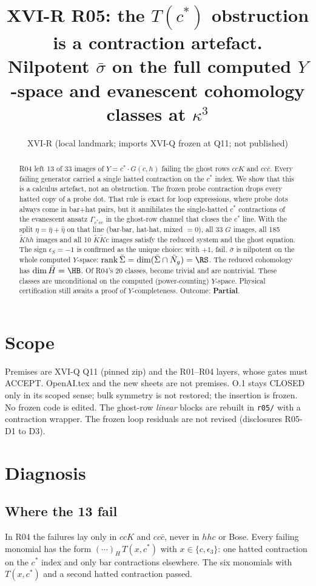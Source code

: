\documentclass[11pt]{article}
\title{XVI-R R05: the $T(c^*)$ obstruction is a contraction artefact.\\
Nilpotent $\bar\sigma$ on the full computed $Y$-space and \HB{} evanescent cohomology classes at $\kappa^3$}
\author{XVI-R (local landmark; imports XVI-Q frozen at Q11; not published)}
\date{}
\begin{document}
\maketitle
\begin{abstract}
R04 left 13 of 33 images of $Y=c^*\cdot G(c,h)$ failing the ghost rows $ccK$ and $cc\bar c$. Every failing generator
carried a single hatted contraction on the $c^*$ index. We show that this is a calculus artefact, not an obstruction.
The frozen probe contraction drops every hatted copy of a probe dot. That rule is exact for loop expressions, where
probe dots always come in bar$+$hat pairs, but it annihilates the single-hatted $c^*$ contractions of the evanescent
ansatz $\Gamma_{c^*cc}$ in the ghost-row channel that closes the $c^*$ line. With the split
$\eta=\bar\eta+\hat\eta$ on that line (bar$\cdot$bar, hat$\cdot$hat, mixed $=0$), all 33 $G$ images, all 185
$\tilde Khh$ images and all 10 $\tilde K\tilde Kc$ images satisfy the reduced system and the ghost equation. The sign
$\epsilon_S=-1$ is confirmed as the unique choice: with $+1$, \EPSP{} fail. $\bar\sigma$ is nilpotent on the whole computed $Y$-space:
$\operatorname{rank}\bar\Sigma=\dim(\bar\Sigma\cap\bar N_g)=\RS$. The reduced cohomology has $\dim\bar H=\HB$. Of R04's
20 classes, \TRT{} become trivial and \TRN{} are nontrivial. These classes are unconditional on the computed (power-counting) $Y$-space.
Physical certification still awaits a proof of $Y$-completeness. Outcome: \textbf{Partial}.
\end{abstract}

\section{Scope}
Premises are XVI-Q Q11 (pinned zip) and the R01--R04 layers, whose gates must ACCEPT. OpenAI.tex and the new sheets
are not premises. O.1 stays CLOSED only in its scoped sense; bulk symmetry is not restored; the insertion is frozen. No
frozen code is edited. The ghost-row \emph{linear} blocks are rebuilt in \texttt{r05/} with a contraction wrapper. The
frozen loop residuals are not revised (disclosures R05-D1 to D3).

\section{Diagnosis}
\subsection{Where the 13 fail}
In R04 the failures lay only in $ccK$ and $cc\bar c$, never in $hhc$ or Bose. Every failing monomial has the form
$(\cdots)_{H}\,T(x,c^*)$ with $x\in\{c,\epsilon_3\}$: one hatted contraction on the $c^*$ index and only bar contractions
elsewhere. The six monomials with $T(x,c^*)$ and a second hatted contraction passed.
\end{document}
